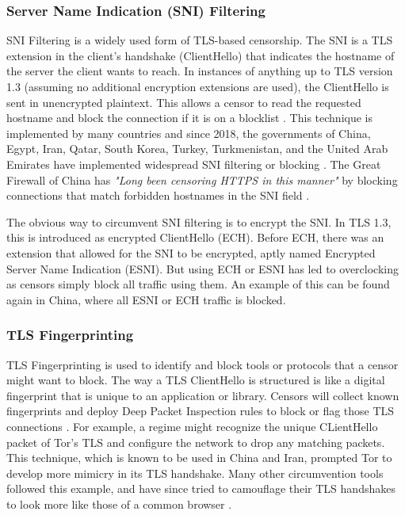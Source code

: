 \subsubsection{Server Name Indication (SNI) Filtering}

SNI Filtering is a widely used form of TLS-based censorship. The SNI is a TLS extension in the client's handshake (ClientHello) that indicates the hostname of the server the client wants to reach. In instances of anything up to TLS version 1.3 (assuming no additional encryption extensions are used), the ClientHello is sent in unencrypted plaintext. This allows a censor to read the requested hostname and block the connection if it is on a blocklist \cite{SNIUnencryptedCloudFlare}. This technique is implemented by many countries and since 2018, the governments of China, Egypt, Iran, Qatar, South Korea, Turkey, Turkmenistan, and the United Arab Emirates have implemented widespread SNI filtering or blocking \cite{rfc9505SNIBlocking}. The Great Firewall of China has \textit{"Long been censoring HTTPS in this manner"} by blocking connections that match forbidden hostnames in the SNI field \cite{GreatFirewallSNI}. 

The obvious way to circumvent SNI filtering is to encrypt the SNI. In TLS 1.3, this is introduced as encrypted ClientHello (ECH). Before ECH, there was an extension that allowed for the SNI to be encrypted, aptly named Encrypted Server Name Indication (ESNI). But using ECH or ESNI has led to overclocking as censors simply block all traffic using them. An example of this can be found again in China, where all ESNI or ECH traffic is blocked.

\subsubsection{TLS Fingerprinting}

TLS Fingerprinting is used to identify and block tools or protocols that a censor might want to block. The way a TLS ClientHello is structured is like a digital fingerprint that is unique to an application or library. Censors will collect known fingerprints and deploy Deep Packet Inspection rules to block or flag those TLS connections \cite{TLSFingerprinting}. For example, a regime might recognize the unique CLientHello packet of Tor's TLS and configure the network to drop any matching packets. This technique, which is known to be used in China and Iran, prompted Tor to develop more mimicry in its TLS handshake. Many other circumvention tools followed this example, and have since tried to camouflage their TLS handshakes to look more like those of a common browser \cite{TLSFingerprinting}.

